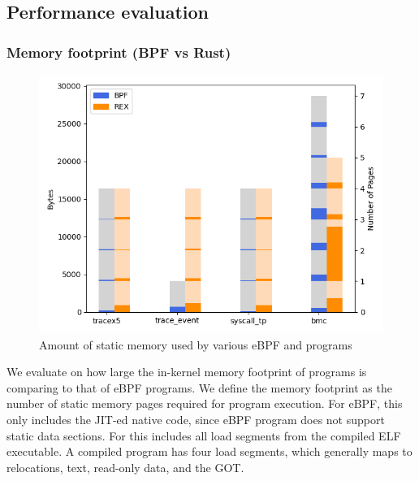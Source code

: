 \subsection{Performance evaluation}
\subsubsection{Memory footprint (BPF vs Rust)}
\begin{figure}
    \includegraphics[width=1.0\linewidth]{figs/mem-footprint.png}
    \centering
    \vspace{-25pt}
    \caption{Amount of static memory used by various eBPF and \projname{}
        programs }
    \label{fig:eval-mem-footprint}
    \vspace{-10pt}
\end{figure}
We evaluate on how large the in-kernel memory footprint of \projname{} programs
    is comparing to that of eBPF programs.
We define the memory footprint as the number of static memory pages required
    for program execution.
For eBPF, this only includes the JIT-ed native code, since eBPF program does
    not support static data sections.
For \projname{} this includes all load segments from the compiled ELF
    executable.
A compiled \projname{} program has four load segments, which generally maps to
    relocations, text, read-only data, and the GOT.

